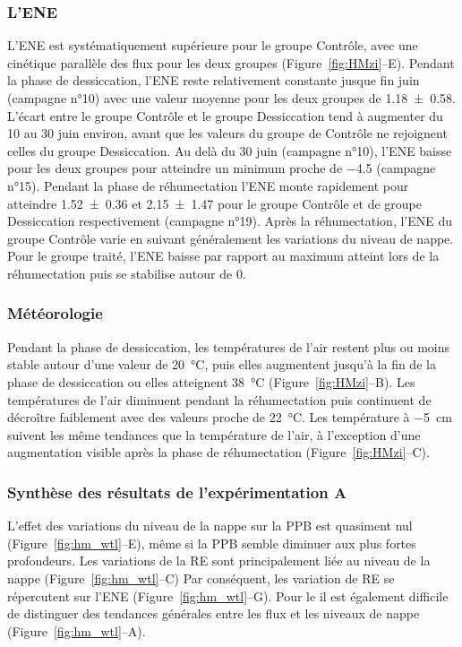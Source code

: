 \subsubsection{L'ENE}

L'ENE est systématiquement supérieure pour le groupe Contrôle, avec une cinétique parallèle des flux pour les deux groupes (Figure~\ref{fig:HMzi}--E).
Pendant la phase de dessiccation, l'ENE reste relativement constante jusque fin juin (campagne n°10) avec une valeur moyenne pour les deux groupes de \SI{1.18(058)}{\uml}.
L'écart entre le groupe Contrôle et le groupe Dessiccation tend à augmenter du 10 au 30 juin environ, avant que les valeurs du groupe de Contrôle ne rejoignent celles du groupe Dessiccation.
Au delà du 30 juin (campagne n°10), l'ENE baisse pour les deux groupes pour atteindre un minimum proche de \SI{-4.5}{\uml} (campagne n°15).
Pendant la phase de réhumectation l'ENE monte rapidement pour atteindre \num{1.52(036)} et \SI{2.15(147)}{\uml} pour le groupe Contrôle et de groupe Dessiccation respectivement (campagne n°19).
Après la réhumectation, l'ENE du groupe Contrôle varie en suivant généralement les variations du niveau de nappe.
Pour le groupe traité, l'ENE baisse par rapport au maximum atteint lors de la réhumectation puis se stabilise autour de 0.

\subsubsection{Météorologie}

Pendant la phase de dessiccation, les températures de l'air restent plus ou moins stable autour d'une valeur de \SI{20}{\degreeCelsius}, puis elles augmentent jusqu'à la fin de la phase de dessiccation ou elles atteignent \SI{38}{\degreeCelsius} (Figure~\ref{fig:HMzi}--B).
Les températures de l'air diminuent pendant la réhumectation puis continuent de décroître faiblement avec des valeurs proche de \SI{22}{\degreeCelsius}.
Les température à \SI{-5}{\centi\metre} suivent les même tendances que la température de l'air, à l'exception d'une augmentation visible après la phase de réhumectation (Figure~\ref{fig:HMzi}--C).


\subsubsection{Synthèse des résultats de l'expérimentation A}

L'effet des variations du niveau de la nappe sur la PPB est quasiment nul (Figure~\ref{fig:hm_wtl}--E), même si la PPB semble diminuer aux plus fortes profondeurs.
Les variations de la RE sont principalement liée au niveau de la nappe (Figure~\ref{fig:hm_wtl}--C) Par conséquent, les variation de RE se répercutent sur l'ENE (Figure~\ref{fig:hm_wtl}--G).
Pour le \chh il est également difficile de distinguer des tendances générales entre les flux et les niveaux de nappe (Figure~\ref{fig:hm_wtl}--A).


